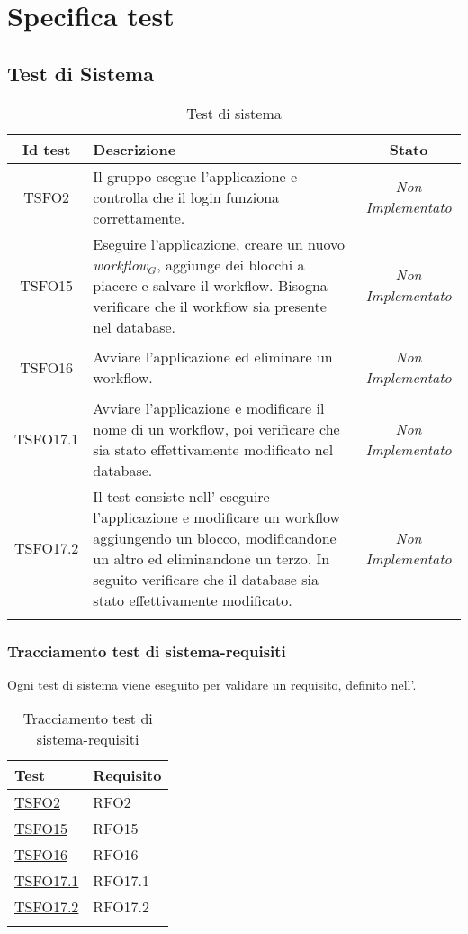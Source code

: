 \chapter{Specifica test}
\label{test}
\section{Test di Sistema}
\normalsize
\begin{longtable}{|c|>{}m{8cm}|c|}
\hline 
\textbf{Id test} & \textbf{Descrizione} & \textbf{Stato}\\
\hline
\endhead
\hypertarget{TSFO2}{TSFO2} & Il gruppo esegue l'applicazione e controlla che il login funziona correttamente. & \textit{Non Implementato}\\ \hline
\hypertarget{TSFO15}{TSFO15} & Eseguire l'applicazione, creare un nuovo \textit{workflow$_{G}$}, aggiunge dei blocchi a piacere e salvare il workflow. Bisogna verificare che il workflow sia presente nel database. & \textit{Non Implementato}\\ \hline
\hypertarget{TSFO16}{TSFO16} & Avviare l'applicazione ed eliminare un workflow. & \textit{Non Implementato}\\ \hline
\hypertarget{TSFO17.1}{TSFO17.1} & Avviare l'applicazione e modificare il nome di un workflow, poi verificare che sia stato effettivamente modificato nel database. & \textit{Non Implementato}\\ \hline
\hypertarget{TSFO17.2}{TSFO17.2} & Il test consiste nell' eseguire l'applicazione e modificare un workflow aggiungendo un blocco, modificandone un altro ed eliminandone un terzo. In seguito verificare che il database sia stato effettivamente modificato. & \textit{Non Implementato}\\ \hline
\caption[Test di Sistema]{Test di sistema}
\label{tabella:test1}
\end{longtable}
\clearpage
\subsection{Tracciamento test di sistema-requisiti}
Ogni test di sistema viene eseguito per validare un requisito, definito nell'\analisideirequisiti.
\normalsize
\begin{longtable}{|>{\centering}m{5cm}|m{5cm}<{\centering}|}
\hline
\textbf{Test} & \textbf{Requisito}\\
\hline
\endhead
\hyperlink{TSFO2}{TSFO2} & RFO2\\ \hline
\hyperlink{TSFO15}{TSFO15} & RFO15\\ \hline
\hyperlink{TSFO16}{TSFO16} & RFO16\\ \hline
\hyperlink{TSFO17.1}{TSFO17.1} & RFO17.1\\ \hline
\hyperlink{TSFO17.2}{TSFO17.2} & RFO17.2\\ \hline
\caption[Tracciamento test di sistema-requisiti]{Tracciamento test di sistema-requisiti}
\label{tabella:ts-requi}
\end{longtable}


